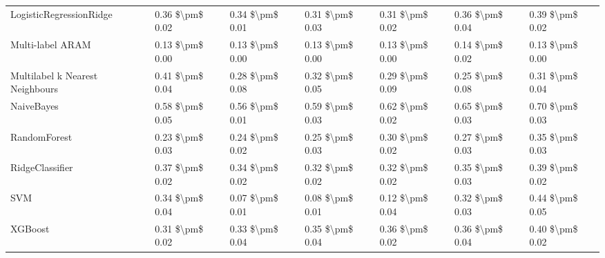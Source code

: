 \begin{tabular}{lllllll}
        LogisticRegressionRidge & 0.36 \$\textbackslash pm\$ 0.02 &           0.34 \$\textbackslash pm\$ 0.01 &       0.31 \$\textbackslash pm\$ 0.03 &        0.31 \$\textbackslash pm\$ 0.02 &                         0.36 \$\textbackslash pm\$ 0.04 & 0.39 \$\textbackslash pm\$ 0.02 \\
               Multi-label ARAM & 0.13 \$\textbackslash pm\$ 0.00 &           0.13 \$\textbackslash pm\$ 0.00 &       0.13 \$\textbackslash pm\$ 0.00 &        0.13 \$\textbackslash pm\$ 0.00 &                         0.14 \$\textbackslash pm\$ 0.02 & 0.13 \$\textbackslash pm\$ 0.00 \\
Multilabel k Nearest Neighbours & 0.41 \$\textbackslash pm\$ 0.04 &           0.28 \$\textbackslash pm\$ 0.08 &       0.32 \$\textbackslash pm\$ 0.05 &        0.29 \$\textbackslash pm\$ 0.09 &                         0.25 \$\textbackslash pm\$ 0.08 & 0.31 \$\textbackslash pm\$ 0.04 \\
                     NaiveBayes & 0.58 \$\textbackslash pm\$ 0.05 &           0.56 \$\textbackslash pm\$ 0.01 &       0.59 \$\textbackslash pm\$ 0.03 &        0.62 \$\textbackslash pm\$ 0.02 &                         0.65 \$\textbackslash pm\$ 0.03 & 0.70 \$\textbackslash pm\$ 0.03 \\
                   RandomForest & 0.23 \$\textbackslash pm\$ 0.03 &           0.24 \$\textbackslash pm\$ 0.02 &       0.25 \$\textbackslash pm\$ 0.03 &        0.30 \$\textbackslash pm\$ 0.02 &                         0.27 \$\textbackslash pm\$ 0.03 & 0.35 \$\textbackslash pm\$ 0.03 \\
                RidgeClassifier & 0.37 \$\textbackslash pm\$ 0.02 &           0.34 \$\textbackslash pm\$ 0.02 &       0.32 \$\textbackslash pm\$ 0.02 &        0.32 \$\textbackslash pm\$ 0.02 &                         0.35 \$\textbackslash pm\$ 0.03 & 0.39 \$\textbackslash pm\$ 0.02 \\
                            SVM & 0.34 \$\textbackslash pm\$ 0.04 &           0.07 \$\textbackslash pm\$ 0.01 &       0.08 \$\textbackslash pm\$ 0.01 &        0.12 \$\textbackslash pm\$ 0.04 &                         0.32 \$\textbackslash pm\$ 0.03 & 0.44 \$\textbackslash pm\$ 0.05 \\
                        XGBoost & 0.31 \$\textbackslash pm\$ 0.02 &           0.33 \$\textbackslash pm\$ 0.04 &       0.35 \$\textbackslash pm\$ 0.04 &        0.36 \$\textbackslash pm\$ 0.02 &                         0.36 \$\textbackslash pm\$ 0.04 & 0.40 \$\textbackslash pm\$ 0.02 \\
\bottomrule
\end{tabular}
